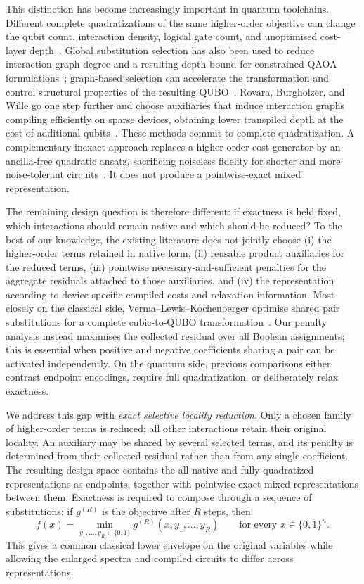 \documentclass[a4paper,onecolumn,11pt,unpublished]{quantumarticle}
\theoremstyle{remark}
\begin{document}
This distinction has become increasingly important in quantum toolchains.
Different complete quadratizations of the same higher-order objective can
change the qubit count, interaction density, logical gate count, and
unoptimised cost-layer depth~\cite{Schmidbauer2024}.  Global substitution
selection has also been used to reduce interaction-graph degree and a resulting
depth bound for constrained QAOA formulations~\cite{Herrman2021}; graph-based selection
can accelerate the transformation and control structural properties of the
resulting QUBO~\cite{Schmidbauer2026}.  Rovara, Burgholzer, and Wille go one
step further and choose auxiliaries that induce interaction graphs compiling
efficiently on sparse devices, obtaining lower transpiled depth at the cost of
additional qubits~\cite{Rovara2026}.  These methods commit to complete
quadratization.  A complementary inexact approach replaces a higher-order cost
generator by an ancilla-free quadratic ansatz, sacrificing noiseless fidelity
for shorter and more noise-tolerant circuits~\cite{Dragoi2026}.  It does not
produce a pointwise-exact mixed representation.

The remaining design question is therefore different: if exactness is held
fixed, which interactions should remain native and which should be reduced?
To the best of our knowledge, the existing literature does not jointly choose
(i) the higher-order terms retained in native form, (ii) reusable product
auxiliaries for the reduced terms, (iii) pointwise necessary-and-sufficient
penalties for the aggregate residuals attached to those auxiliaries, and
(iv) the representation according to device-specific compiled costs and
relaxation information.  Most closely on the classical side,
Verma--Lewis--Kochenberger optimise shared pair substitutions for a complete
cubic-to-QUBO transformation~\cite{VermaLewisKochenberger2021}.  Our penalty
analysis instead maximises the collected residual over all Boolean assignments;
this is essential when positive and negative coefficients sharing a pair can
be activated independently.  On the quantum side, previous comparisons either
contrast endpoint encodings, require full quadratization, or deliberately relax
exactness.

We address this gap with \emph{exact selective locality reduction}.  Only a
chosen family of higher-order terms is reduced; all other interactions retain
their original locality.  An auxiliary may be shared by several selected
terms, and its penalty is determined from their collected residual rather than
from any single coefficient.  The resulting design space contains the
all-native and fully quadratized representations as endpoints, together with
pointwise-exact mixed representations between them.  Exactness is required to
compose through a sequence of substitutions: if $g^{(R)}$ is the objective
after $R$ steps, then
\begin{equation}
    f(x)=\min_{y_1,\ldots,y_R\in\{0,1\}}
          g^{(R)}(x,y_1,\ldots,y_R)
    \qquad\text{for every }x\in\{0,1\}^{n}.
    \label{eq:intro-composition}
\end{equation}
This gives a common classical lower envelope on the original variables while
allowing the enlarged spectra and compiled circuits to differ across
representations.
\end{document}
